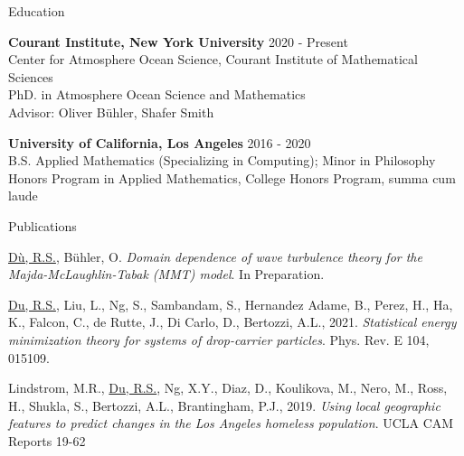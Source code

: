 \documentclass{resume} %
\begin{document}

\begin{rSection}{Education}

{\bf Courant Institute, New York University} \hfill {2020 - Present} \\
Center for Atmosphere Ocean Science, Courant Institute of Mathematical Sciences\\
PhD. in Atmosphere Ocean Science and Mathematics\\
Advisor: Oliver B\"uhler, Shafer Smith

{\bf University of California, Los Angeles} \hfill {2016 - 2020} \\
B.S. Applied Mathematics (Specializing in Computing); Minor in Philosophy\\
Honors Program in Applied Mathematics, College Honors Program, summa cum laude

\end{rSection}


\begin{rSection}{Publications}
\begin{etaremune}
    \item \underline{D\`u, R.S.}, B\"uhler, O. \textit{Domain dependence of wave turbulence theory for the Majda-McLaughlin-Tabak (MMT) model}. In Preparation.
    \item \underline{Du, R.S.}, Liu, L., Ng, S., Sambandam, S., Hernandez Adame, B., Perez, H., Ha, K., Falcon, C., de Rutte, J., Di Carlo, D., Bertozzi, A.L., 2021. \textit{Statistical energy minimization theory for systems of drop-carrier particles}. Phys. Rev. E 104, 015109.
    \item Lindstrom, M.R., \underline{Du, R.S.}, Ng, X.Y., Diaz, D., Koulikova, M., Nero, M., Ross, H., Shukla, S., Bertozzi, A.L., Brantingham, P.J., 2019. \textit{Using local geographic features to predict changes in the Los Angeles homeless population}. UCLA CAM Reports 19-62
\end{etaremune}
\end{rSection}

\end{document}
